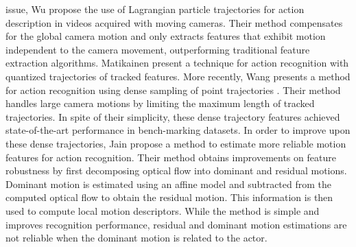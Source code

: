 issue, Wu \etal \cite{Wu2011a} propose the use of Lagrangian particle trajectories for action description in
videos acquired with moving cameras. Their method compensates for the global camera motion and only extracts
features that exhibit motion independent to the camera movement, outperforming traditional feature
extraction algorithms. Matikainen \etal \cite{Matikainen2009} present a technique for action recognition
with quantized trajectories of tracked features. More recently, Wang \etal presents a method for action
recognition using dense sampling of point trajectories \cite{WangCVPR2011}. Their method handles large
camera motions by limiting the maximum length of tracked trajectories. In spite of their simplicity, these
dense trajectory features achieved state-of-the-art performance in bench-marking datasets. In order to
improve upon these dense trajectories, Jain \etal \cite{Jain2013} propose a method to estimate more reliable
motion features for action recognition. Their method obtains improvements on feature robustness  by first
decomposing optical flow into dominant and residual motions. Dominant motion is estimated using an affine
model and subtracted from the computed optical flow to obtain the residual motion. This information is then
used to compute local motion descriptors. While the method is simple and improves recognition performance,
residual and dominant motion estimations are not reliable when the dominant motion is related to the actor.